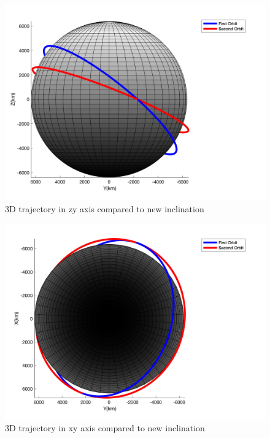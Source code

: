 \begin{figure}[H]
    \caption{3D trajectory in zy axis compared to new inclination}
    \centering
    \includegraphics[width=16cm]{../Figure/Q2/yz_view_compare}
\end{figure}

\begin{figure}[H]
    \caption{3D trajectory in xy axis compared to new inclination}
    \centering
    \includegraphics[width=16cm]{../Figure/Q2/xy_view_compare}
\end{figure}


